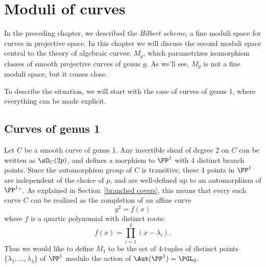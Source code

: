 

\chapter{Moduli of curves}
\label{CurvesModuli chapter}\label{CurvesModuliChapter}


In the preceding chapter, we described the \emph{Hilbert scheme}, a fine moduli space for curves in projective space. In
this chapter we will discuss the second moduli space central to the theory of algebraic curves: $M_g$, which parametrizes isomorphism classes of smooth projective curves of genus $g$. As we'll see, $M_g$ is not a fine moduli space, but it comes close.

To describe the situation,  we will start with the case of curves of genus 1, where everything can be made explicit.


\section{Curves of genus 1}\label{Curves of genus 1}

Let $C$ be a smooth curve of genus 1. Any invertible sheaf of degree 2 on $C$ can be written as
%
%
$\sO_C(2p)$, and defines
a morphism to $\PP^1$ with 4 distinct branch points. Since the automorphism group of $C$ is transitive,
these 4 points in $\PP^1$ are independent of the choice of $p$, and are well-defined
up to an automorphism of $\PP^1` `$.    As explained in Section~\ref{branched covers},  this means that every such curve $C$ can be realized as the completion of an affine curve
$$
y^2 = f(x)
$$
where $f$ is a quartic polynomial with distinct roots:
\vspace*{-2pt}
$$
f(x) = \prod_{i=1}^4 (x - \lambda_i).
$$
Thus we would like to define $M_1$ to be the set of 4-tuples of
distinct points $\{\lambda_{1}, \dots, \lambda_{4}\}$ of $\PP^1$
%
modulo the action of $\Aut(\PP^1) =
\PGL_2
$.

